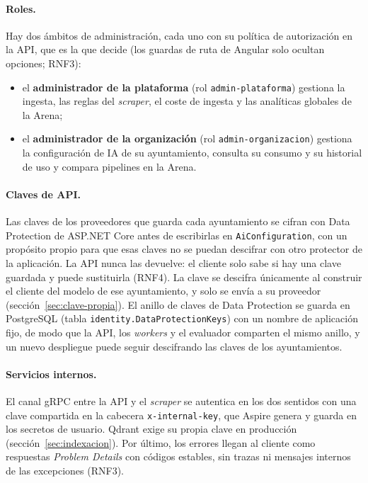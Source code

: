 \paragraph{Roles.} Hay dos ámbitos de administración, cada uno con su política de autorización en la API, que es la que decide (los guardas de ruta de Angular solo ocultan opciones; RNF3):

\begin{itemize}
  \item el \textbf{administrador de la plataforma} (rol \texttt{admin-plataforma}) gestiona la ingesta, las reglas del \emph{scraper}, el coste de ingesta y las analíticas globales de la Arena;
  \item el \textbf{administrador de la organización} (rol \texttt{admin-organizacion}) gestiona la configuración de IA de su ayuntamiento, consulta su consumo y su historial de uso y compara pipelines en la Arena.
\end{itemize}

\paragraph{Claves de API.} Las claves de los proveedores que guarda cada ayuntamiento se cifran con Data Protection de ASP.NET Core \cite{dataprotection} antes de escribirlas en \texttt{AiConfiguration}, con un propósito propio para que esas claves no se puedan descifrar con otro protector de la aplicación. La API nunca las devuelve: el cliente solo sabe si hay una clave guardada y puede sustituirla (RNF4). La clave se descifra únicamente al construir el cliente del modelo de ese ayuntamiento, y solo se envía a su proveedor (sección~\ref{sec:clave-propia}). El anillo de claves de Data Protection se guarda en PostgreSQL (tabla \texttt{identity.DataProtectionKeys}) con un nombre de aplicación fijo, de modo que la API, los \emph{workers} y el evaluador comparten el mismo anillo, y un nuevo despliegue puede seguir descifrando las claves de los ayuntamientos.

\paragraph{Servicios internos.} El canal gRPC entre la API y el \emph{scraper} se autentica en los dos sentidos con una clave compartida en la cabecera \texttt{x-internal-key}, que Aspire genera y guarda en los secretos de usuario. Qdrant exige su propia clave en producción (sección~\ref{sec:indexacion}). Por último, los errores llegan al cliente como respuestas \emph{Problem Details} con códigos estables, sin trazas ni mensajes internos de las excepciones (RNF3).
